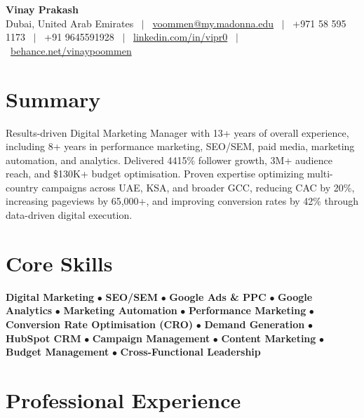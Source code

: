 \documentclass[10.5pt,a4paper]{article}
\begin{document}
\begin{center}
{\LARGE\bfseries Vinay Prakash}\\[0.3em]
\small Dubai, United Arab Emirates \ $|$ \ 
\href{mailto:voommen@my.madonna.edu}{voommen@my.madonna.edu} \ $|$ \ 
+971 58 595 1173 \ $|$ \ 
+91 9645591928 \ $|$ \ 
\href{https://linkedin.com/in/vipr0}{linkedin.com/in/vipr0} \ $|$ \ 
\href{https://behance.net/vinaypoommen}{behance.net/vinaypoommen}
\end{center}
\vspace{-6pt}

\section{Summary}
\small{Results-driven Digital Marketing Manager with 13+ years of overall experience, including 8+ years in performance marketing, SEO/SEM, paid media, marketing automation, and analytics. Delivered 4415\% follower growth, 3M+ audience reach, and \$130K+ budget optimisation. Proven expertise optimizing multi-country campaigns across UAE, KSA, and broader GCC, reducing CAC by 20\%, increasing pageviews by 65,000+, and improving conversion rates by 42\% through data-driven digital execution.}

\section{Core Skills}
\small{\textbf{Digital Marketing} $\bullet$ \textbf{SEO/SEM} $\bullet$ \textbf{Google Ads \& PPC} $\bullet$ \textbf{Google Analytics} $\bullet$ \textbf{Marketing Automation} $\bullet$ \textbf{Performance Marketing} $\bullet$ \textbf{Conversion Rate Optimisation (CRO)} $\bullet$ \textbf{Demand Generation} $\bullet$ \textbf{HubSpot CRM} $\bullet$ \textbf{Campaign Management} $\bullet$ \textbf{Content Marketing} $\bullet$ \textbf{Budget Management} $\bullet$ \textbf{Cross-Functional Leadership}}

\section{Professional Experience}
\end{document}
